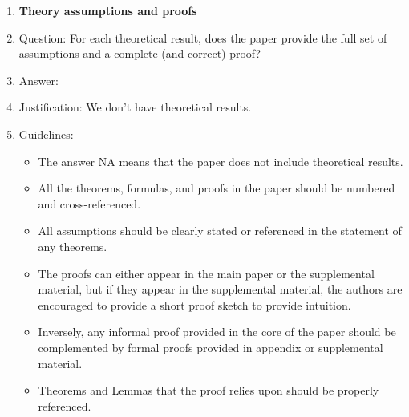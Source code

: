 \documentclass{article}
\begin{document}
\begin{enumerate}
\item {\bf Theory assumptions and proofs}
    \item[] Question: For each theoretical result, does the paper provide the full set of assumptions and a complete (and correct) proof?
    \item[] Answer: \answerNA{} %
    \item[] Justification: We don't have theoretical results.
    \item[] Guidelines:
    \begin{itemize}
        \item The answer NA means that the paper does not include theoretical results. 
        \item All the theorems, formulas, and proofs in the paper should be numbered and cross-referenced.
        \item All assumptions should be clearly stated or referenced in the statement of any theorems.
        \item The proofs can either appear in the main paper or the supplemental material, but if they appear in the supplemental material, the authors are encouraged to provide a short proof sketch to provide intuition. 
        \item Inversely, any informal proof provided in the core of the paper should be complemented by formal proofs provided in appendix or supplemental material.
        \item Theorems and Lemmas that the proof relies upon should be properly referenced. 
    \end{itemize}


\end{enumerate}
\end{document}
